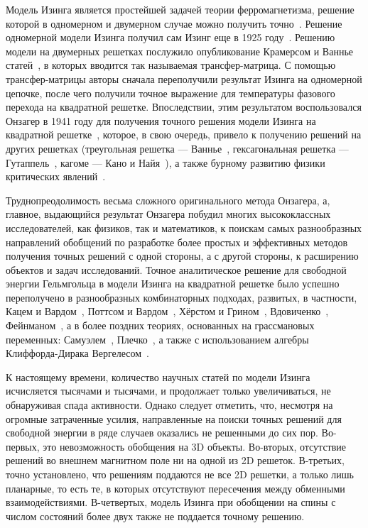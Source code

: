 Модель Изинга является простейшей задачей теории ферромагнетизма, решение которой в одномерном и двумерном случае можно получить точно~\cite{baxter1985}. Решение одномерной модели Изинга получил сам Изинг еще в 1925 году~\cite{ising1925}. Решению модели на двумерных решетках послужило опубликование Крамерсом и Ваннье статей~\cite{kramers_wannier1, kramers_wannier2}, в которых вводится так называемая трансфер-матрица. С помощью трансфер-матрицы авторы сначала переполучили результат Изинга на одномерной цепочке, после чего получили точное выражение для температуры фазового перехода на квадратной решетке. Впоследствии, этим результатом воспользовался Онзагер в 1941 году для получения точного решения модели Изинга на квадратной решетке~\cite{onsager1941}, которое, в свою очередь, привело к получению решений на других решетках (треугольная решетка --- Ваннье~\cite{wannier1950}, гексагональная решетка --- Гутаппель~\cite{houtapell1950}, кагоме --- Кано и Найя~\cite{kano_naya1953}), а также бурному развитию физики критических явлений~\cite{yang1952, brush1967, mussardo2010}. 

Труднопреодолимость весьма сложного оригинального метода Онзагера, а, главное, выдающийся результат Онзагера побудил многих высококлассных исследователей, как физиков, так и математиков, к поискам самых разнообразных направлений обобщений по разработке более простых и эффективных методов получения точных решений с одной стороны, а с другой стороны, к расширению объектов и задач исследований. Точное аналитическое решение для свободной энергии Гельмгольца в модели Изинга на квадратной решетке было успешно переполучено в разнообразных комбинаторных подходах, развитых, в частности, Кацем и Вардом~\cite{kac1952}, Поттсом и Вардом~\cite{potts1955}, Хёрстом и Грином~\cite{hurst1960}, Вдовиченко~\cite{vdovichenko1965_1, vdovichenko1965_2}, Фейнманом~\cite{feynmann1972}, а в более поздних теориях, основанных на грассмановых переменных: Самуэлем~\cite{samuel1980}, Плечко~\cite{plechko1985}, а также с использованием алгебры Клиффорда-Дирака Вергелесом~\cite{vergeles2009}.

К настоящему времени, количество научных статей по модели Изинга исчисляется тысячами и тысячами, и продолжает только увеличиваться, не обнаруживая спада активности. Однако следует отметить, что, несмотря на огромные затраченные усилия, направленные на поиски точных решений для свободной энергии в ряде случаев оказались не решенными до сих пор. Во-первых, это невозможность обобщения на 3D объекты. Во-вторых, отсутствие решений во внешнем магнитном поле ни на одной из 2D решеток. В-третьих, точно установлено, что решениям поддаются не все 2D решетки, а только лишь планарные, то есть те, в которых отсутствуют пересечения между обменными взаимодействиями. В-четвертых, модель Изинга при обобщении на спины с числом состояний более двух также не поддается точному решению. 

